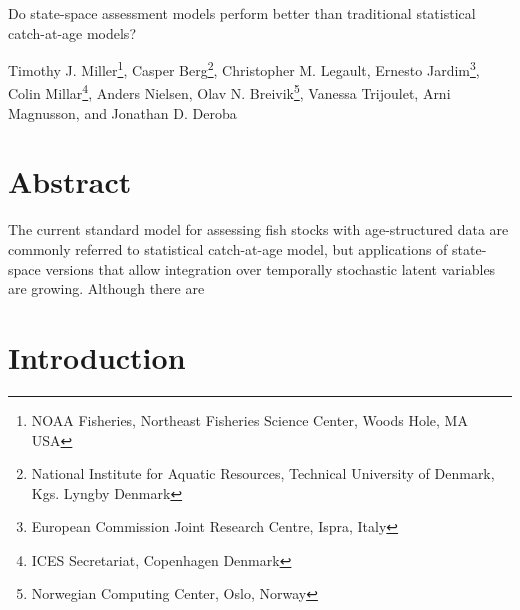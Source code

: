 \documentclass[12pt,letterpaper, leqno]{article}
\begin{document}


\pagestyle{plain}

\begin{titlepage}\center \large

\vspace{144pt}

Do state-space assessment models perform better than traditional statistical catch-at-age models?

\vspace{144pt}

Timothy J. Miller\footnote{NOAA Fisheries, Northeast Fisheries Science Center, Woods Hole, MA USA}, 
Casper Berg\footnote{National Institute for Aquatic Resources, Technical University of Denmark, Kgs. Lyngby
Denmark}, 
Christopher M. Legault\footnotemark[1], 
Ernesto Jardim\footnote{European Commission Joint Research Centre, Ispra, Italy}, 
Colin Millar\footnote{ICES Secretariat, Copenhagen Denmark},
Anders Nielsen\footnotemark[2], 
Olav N. Breivik\footnote{Norwegian Computing Center, Oslo, Norway}, 
Vanessa Trijoulet\footnotemark[2], 
Arni Magnusson\footnotemark[4], 
and
Jonathan D. Deroba\footnotemark[1]
\end{titlepage}

\setcounter{page}{2}

\cfoot{\thepage}

\setcounter{page}{2}
\def\fourteenbold{\fontseries{b}\fontsize{14pt}{12pt}\selectfont}
\def\twelvebold{\fontseries{b}\fontsize{12pt}{12pt}\selectfont}
\def\twelveit{\fontshape{it}\fontseries{m}\fontsize{12pt}{12pt}\selectfont}
\sectionfont{\fourteenbold}
\subsectionfont{\twelvebold}
\subsectionfont{\twelvebold}
\subsubsectionfont{\twelveit}

\setcounter{footnote}{0}


\section*{Abstract}

The current standard model for assessing fish stocks with age-structured data are commonly referred to statistical catch-at-age model, but applications of state-space versions that allow integration over temporally stochastic latent variables are growing. Although there are  

\pagebreak

\section*{Introduction}
\end{document}
